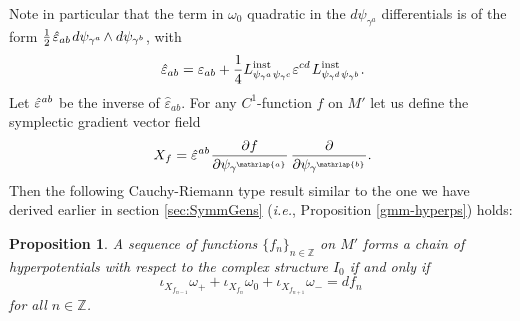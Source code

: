 \documentclass[11pt]{amsart}
\newtheorem{proposition}[theorem]{Proposition}
\theoremstyle{remark}
\theoremstyle{remark}
\theoremstyle{definition}
\theoremstyle{definition}
\theoremstyle{definition}
\newcommand{\0}{{\scriptstyle 0'}} %
\newcommand{\1}{{\scriptstyle 1'}}
\newcommand{\pt}{\hspace{1pt}} %
\newcommand{\hp}{\hspace{0.5pt}} %
\newcommand{\npt}{\hspace{-1pt}} %
\begin{document}
Note in particular that the term in $\omega_0$ quadratic in the $d\psi_{\gamma^a}$ differentials is of the form $\frac{1}{2} \pt \hat{\varepsilon}_{ab} \pt d\psi_{\gamma^{\smash a}} \npt \wedge d\psi_{\gamma^{\smash b}}$, with
\begin{equation}
\hat{\varepsilon}_{ab} = \varepsilon_{ab} + \frac{1}{4} L^{\text{inst}}_{\psi_{\gamma^{\smash a}}\psi_{\gamma^{\smash c}}} \varepsilon^{cd} \pt L^{\text{inst}}_{\psi_{\gamma^{\smash d}}\psi_{\gamma^{\smash b}}}
\rlap{.}
\end{equation}
Let $\hat{\varepsilon}^{\hp ab}$ be the inverse of $\hat{\varepsilon}_{ab}$.  For any $C^1$-function $f$ on $M'$ let us define the symplectic gradient vector field 
\begin{equation} \label{GMN-Xf}
X_f = \hat{\varepsilon}^{\hp ab} \hp \frac{\partial f}{\partial \psi_{\smash{\gamma^{\smash{\mathrlap{a}}}}}} \pt\hp
\frac{\partial }{\partial \psi_{\smash{\gamma^{\mathrlap{b}}}}}
\rlap{.}
\end{equation}
Then the following Cauchy-Riemann type result similar to the one we have derived earlier in section \ref{sec:SymmGens} (\textit{i.e.}, Proposition \ref{gmm-hyperps}) holds:

\begin{proposition} \label{GMN-gmm-hyperps}
A sequence of functions $\{f_n\}_{n \in \mathbb{Z}}$ on $M'$ forms a chain of hyperpotentials with respect to the complex structure $I_0$ if and only if
\begin{equation}
\iota_{X_{f_{n-1}}}\omega_+ + \iota_{X_{f_n}}\omega_0 + \iota_{X_{f_{n+1}}}\omega_- = df_n
\end{equation}
for all $n \in \mathbb{Z}$.
\end{proposition}
\end{document}
